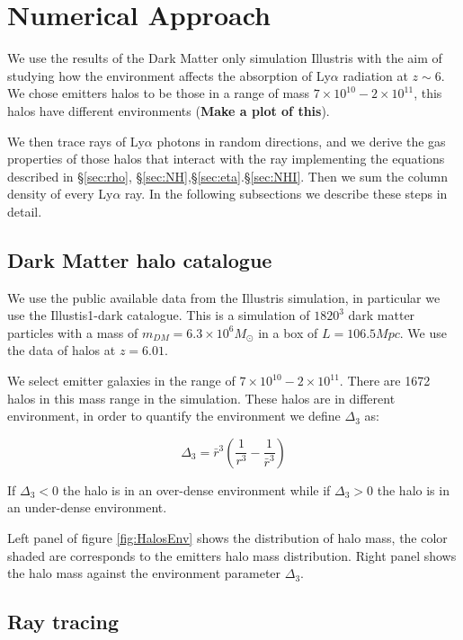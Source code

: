 \documentclass[12pt]{article}
\begin{document}
\section{Numerical Approach}

We use the results of the Dark Matter only simulation Illustris with the aim
of studying how the environment affects the absorption of
Ly$\alpha$ radiation at $z\sim6$. We chose emitters halos to be
those in a range of mass  $7 \times 10^{10} - 2 \times 10^{11}$, this
halos have different environments (\textbf{Make a plot of this}).

We then trace rays of Ly$\alpha$ photons in random directions, and we derive
the gas properties of those halos that interact with the ray
implementing the equations described in \S \ref{sec:rho},
\S \ref{sec:NH},\S \ref{sec:eta}.\S \ref{sec:NHI}. Then we sum the column
density of every Ly$\alpha$ ray. In the following subsections we describe
these steps in detail.

\subsection{Dark Matter halo catalogue}

We use the public available data from the Illustris simulation, in particular we use
the Illustis1-dark catalogue. This is a simulation of $1820^3$ dark matter particles
with a mass of $m_{DM}=6.3 \times 10^6 M_{\odot}$ in a box of $L=106.5 Mpc$. We use
the data of halos at $z = 6.01$.

We select emitter galaxies in the range of $7 \times 10^{10} - 2 \times 10^{11}$.
There are 1672 halos in this mass range in the simulation. These halos
are in different environment, in order to quantify the environment we
define $\Delta_3$ as:

\begin{equation}
\Delta_3  = \bar{r}^3 \left( \dfrac{1}{r^3} - \dfrac{1}{\bar{r}^3} \right)
\end{equation}

If $\Delta_3 < 0 $ the halo is in an over-dense environment while
if $\Delta_3 > 0 $ the halo is in an under-dense environment.

Left panel of figure \ref{fig:HalosEnv} shows the distribution of
halo mass, the color shaded are corresponds to the emitters halo mass
distribution. Right panel shows the halo mass against the
environment parameter $\Delta_3$.

\subsection{Ray tracing}
\end{document}
